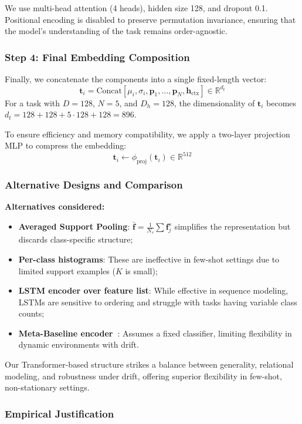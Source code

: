 \documentclass[conference]{IEEEtran}
\begin{document}
We use multi-head attention (4 heads), hidden size 128, and dropout 0.1. Positional encoding is disabled to preserve permutation invariance, ensuring that the model’s understanding of the task remains order-agnostic.

\subsubsection*{Step 4: Final Embedding Composition}

Finally, we concatenate the components into a single fixed-length vector:
\[
\mathbf{t}_i = \text{Concat}[\mu_i, \sigma_i, \mathbf{p}_1, \ldots, \mathbf{p}_N, \mathbf{h}_{\text{ctx}}] \in \mathbb{R}^{d_t}
\]
For a task with $D = 128$, $N = 5$, and $D_h = 128$, the dimensionality of $\mathbf{t}_i$ becomes $d_t = 128 + 128 + 5 \cdot 128 + 128 = 896$.

To ensure efficiency and memory compatibility, we apply a two-layer projection MLP to compress the embedding:
\[
\mathbf{t}_i \leftarrow \phi_{\text{proj}}(\mathbf{t}_i) \in \mathbb{R}^{512}
\]

\subsubsection*{Alternative Designs and Comparison}

\textbf{Alternatives considered:}
\begin{itemize}
    \item \textbf{Averaged Support Pooling}: $\bar{\mathbf{f}} = \frac{1}{N_s} \sum \mathbf{f}_j^s$ simplifies the representation but discards class-specific structure;
    \item \textbf{Per-class histograms}: These are ineffective in few-shot settings due to limited support examples ($K$ is small);
    \item \textbf{LSTM encoder over feature list}: While effective in sequence modeling, LSTMs are sensitive to ordering and struggle with tasks having variable class counts;
    \item \textbf{Meta-Baseline encoder~\cite{chen2021meta}}: Assumes a fixed classifier, limiting flexibility in dynamic environments with drift.
\end{itemize}

Our Transformer-based structure strikes a balance between generality, relational modeling, and robustness under drift, offering superior flexibility in few-shot, non-stationary settings.

\subsubsection*{Empirical Justification}
\end{document}
